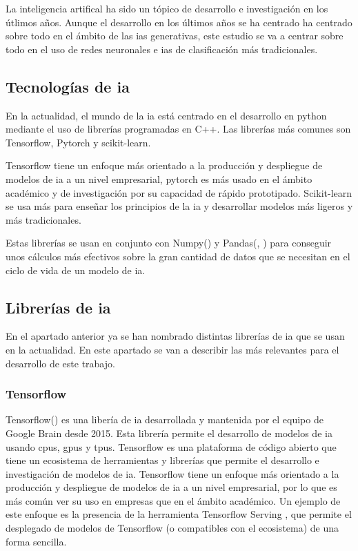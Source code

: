 La inteligencia artifical ha sido un tópico de desarrollo e investigación en los útlimos años. Aunque el desarrollo en los últimos años se ha centrado ha centrado sobre todo en el ámbito de las \glspl{ia} generativas, este estudio se va a centrar sobre todo en el uso de redes neuronales e \glspl{ia} de clasificación más tradicionales.

\subsection{Tecnologías de \gls{ia}}

En la actualidad, el mundo de la \gls{ia} está centrado en el desarrollo en python mediante el uso de librerías programadas en C++. Las librerías más comunes son Tensorflow, Pytorch y scikit-learn.

Tensorflow tiene un enfoque más orientado a la producción y despliegue de modelos de \gls{ia} a un nivel empresarial, pytorch es más usado en el ámbito académico y de investigación por su capacidad de rápido prototipado. Scikit-learn se usa más para enseñar los principios de la \gls{ia} y desarrollar modelos más ligeros y más tradicionales.

Estas librerías se usan en conjunto con Numpy(\cite{harris2020array}) y Pandas(\cite{reback2020pandas}, \cite{mckinney-proc-scipy-2010}) para conseguir unos cálculos más efectivos sobre la gran cantidad de datos que se necesitan en el ciclo de vida de un modelo de \gls{ia}.

\subsection{Librerías de \gls{ia}}

En el apartado anterior ya se han nombrado distintas librerías de \gls{ia} que se usan en la actualidad. En este apartado se van a describir las más relevantes para el desarrollo de este trabajo.

\subsubsection{Tensorflow}

Tensorflow(\cite{tensorflow2015-whitepaper}) es una libería de \gls{ia} desarrollada y mantenida por el equipo de Google Brain desde 2015. Esta librería permite el desarrollo de modelos de \gls{ia} usando \glspl{cpu}, \glspl{gpu} y \glspl{tpu}. Tensorflow es una plataforma de código abierto que tiene un ecosistema de herramientas y librerías que permite el desarrollo e investigación de modelos de \gls{ia}.
Tensorflow tiene un enfoque más orientado a la producción y despliegue de modelos de \gls{ia} a un nivel empresarial, por lo que es más común ver su uso en empresas que en el ámbito académico. Un ejemplo de este enfoque es la presencia de la herramienta Tensorflow Serving \cite{olston2017tensorflowservingflexiblehighperformanceml}, que permite el desplegado de modelos de Tensorflow (o compatibles con el ecosistema) de una forma sencilla.

